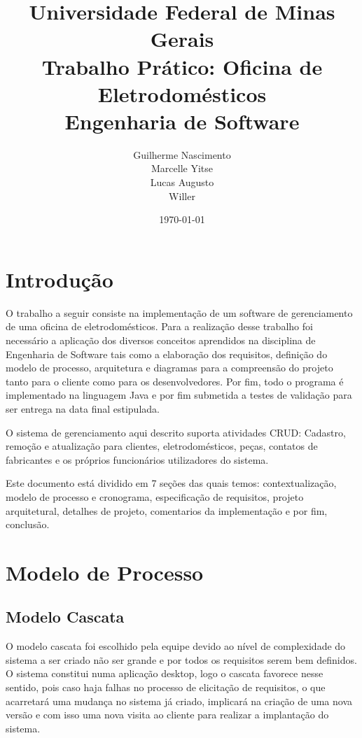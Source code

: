 \documentclass[a4paper,10pt]{article}
\begin{document}
\title{\textbf{Universidade Federal de Minas Gerais}\\
		Trabalho Prático: Oficina de Eletrodomésticos\\
		Engenharia de Software}

\author{Guilherme Nascimento\\
	Marcelle Yitse\\
	Lucas Augusto\\
	Willer\\
}
	
\date{\today}  %
\maketitle


\section{Introdução }
O trabalho a seguir consiste na implementação de um software de gerenciamento de uma oficina de eletrodomésticos. Para a realização desse trabalho foi necessário a aplicação dos diversos conceitos aprendidos na disciplina de Engenharia de Software tais como a elaboração dos requisitos, definição do modelo de processo, arquitetura e diagramas para a compreensão do projeto tanto para o cliente como para os desenvolvedores. Por fim, todo o programa é implementado na linguagem Java e por fim submetida a testes de validação para ser entrega na data final estipulada.

O sistema de gerenciamento aqui descrito suporta atividades CRUD: Cadastro, remoção e atualização para clientes, eletrodomésticos, peças, contatos de fabricantes e os próprios funcionários utilizadores do sistema.

Este documento está dividido em 7 seções das quais temos: contextualização, modelo de processo e cronograma, especificação de requisitos, projeto arquitetural, detalhes de projeto, comentarios da implementação e por fim, conclusão.


\section{Modelo de Processo}
\subsection{Modelo Cascata}

O modelo cascata foi escolhido pela equipe devido ao nível de complexidade do sistema a ser criado não ser grande e por todos os requisitos serem bem definidos. O sistema constitui numa aplicação desktop, logo o cascata favorece nesse sentido, pois caso haja falhas no processo de elicitação de requisitos, o que acarretará uma mudança no sistema já criado, implicará na criação de uma nova versão e com isso uma nova visita ao cliente para realizar a implantação do sistema. 
\end{document}
